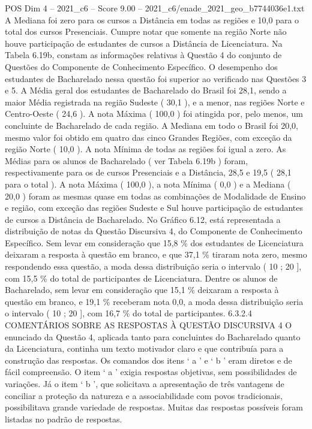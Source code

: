 \begin{textsample}{POS Dim 4 – 2021\_c6 – Score 9.00 – 2021\_c6/enade\_2021\_geo\_b7744036e1.txt}
A Mediana foi zero para os cursos a Distância em todas as regiões e 10,0 para o total dos cursos Presenciais.
Cumpre notar que somente na região Norte não houve participação de estudantes de cursos a Distância de Licenciatura.
Na Tabela 6.19b, constam as informações relativas à Questão 4 do conjunto de Questões do Componente de Conhecimento Específico.
O desempenho dos estudantes de Bacharelado nessa questão foi superior ao verificado nas Questões 3 e 5.
A Média geral dos estudantes de Bacharelado do Brasil foi 28,1, sendo a maior Média registrada na região Sudeste ( 30,1 ), e a menor, nas regiões Norte e Centro-Oeste ( 24,6 ).
A nota Máxima ( 100,0 ) foi atingida por, pelo menos, um concluinte de Bacharelado de cada região.
A Mediana em todo o Brasil foi 20,0, mesmo valor foi obtido em quatro das cinco Grandes Regiões, com exceção da região Norte ( 10,0 ).
A nota Mínima de todas as regiões foi igual a zero.
As Médias para os alunos de Bacharelado ( ver Tabela 6.19b ) foram, respectivamente para os de cursos Presenciais e a Distância, 28,5 e 19,5 ( 28,1 para o total ).
A nota Máxima ( 100,0 ), a nota Mínima ( 0,0 ) e a Mediana ( 20,0 ) foram as mesmas quase em todas as combinações de Modalidade de Ensino e região, com exceção das regiões Sudeste e Sul houve participação de estudantes de cursos a Distância de Bacharelado.
No Gráfico 6.12, está representada a distribuição de notas da Questão Discursiva 4, do Componente de Conhecimento Específico.
Sem levar em consideração que 15,8 \% dos estudantes de Licenciatura deixaram a resposta à questão em branco, e que 37,1 \% tiraram nota zero, mesmo respondendo essa questão, a moda dessa distribuição seria o intervalo ( 10 ; 20 ], com 15,5 \% do total de participantes de Licenciatura.
Dentre os alunos de Bacharelado, sem levar em consideração que 15,1 \% deixaram a resposta à questão em branco, e 19,1 \% receberam nota 0,0, a moda dessa distribuição seria o intervalo ( 10 ; 20 ], com 16,7 \% do total de participantes. 6.3.2.4 COMENTÁRIOS SOBRE AS RESPOSTAS À QUESTÃO DISCURSIVA 4 O enunciado da Questão 4, aplicada tanto para concluintes do Bacharelado quanto da Licenciatura, continha um texto motivador claro e que contribuía para a construção das respostas.
Os comandos dos itens ‘ a ’ e ‘ b ’ eram diretos e de fácil compreensão.
O item ‘ a ’ exigia respostas objetivas, sem possibilidades de variações.
Já o item ‘ b ’, que solicitava a apresentação de três vantagens de conciliar a proteção da natureza e a associabilidade com povos tradicionais, possibilitava grande variedade de respostas.
Muitas das respostas possíveis foram listadas no padrão de respostas.

\end{textsample}
